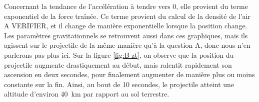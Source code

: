 \documentclass[a4paper,12pt,twoside]{article}
\begin{document}
Concernant la tendance de l'accélération à tendre vers 0, elle provient du terme exponentiel de la force traînée.
Ce terme provient du calcul de la densité de l'air A VERIFIER, et il change de manière exponentielle lorsque la position change.
Les paramètres gravitationnels se retrouvent aussi dans ces graphiques, mais ils agissent sur le projectile de la même manière qu'à la question A, donc nous n'en parlerons pas plus ici.
Sur la figure \ref{fig:B-zt}, on observe que la position du projectile augmente drastiquement au début, mais ralentit rapidement son ascension en deux secondes, pour finalement augmenter de manière plus ou moins constante sur la fin.
Ainsi, au bout de 10 secondes, le projectile atteint une altitude d'environ \SI{40}{\kilo\meter} par rapport au sol terrestre.\\
\end{document}
